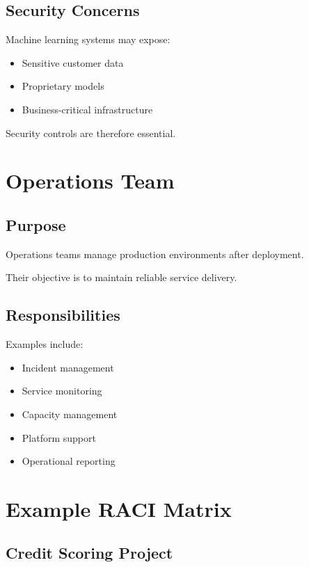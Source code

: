 \subsection{Security Concerns}

Machine learning systems may expose:

\begin{itemize}
    \item Sensitive customer data
    \item Proprietary models
    \item Business-critical infrastructure
\end{itemize}

Security controls are therefore essential.

\section{Operations Team}

\subsection{Purpose}

Operations teams manage production environments after deployment.

Their objective is to maintain reliable service delivery.

\subsection{Responsibilities}

Examples include:

\begin{itemize}
    \item Incident management
    \item Service monitoring
    \item Capacity management
    \item Platform support
    \item Operational reporting
\end{itemize}

\section{Example RACI Matrix}

\subsection{Credit Scoring Project}

